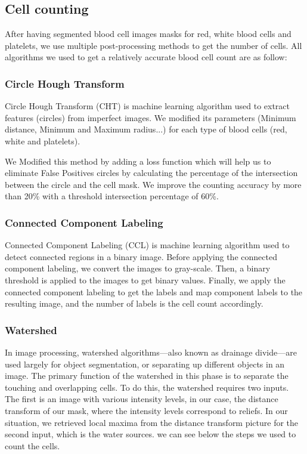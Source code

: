 \documentclass[conference]{IEEEtran}
\begin{document}
\subsection{Cell counting}
After having segmented blood cell images masks for red, white blood cells and platelets, we use multiple post-processing methods to get the number of cells. All  algorithms we used to get a relatively accurate blood cell
count are as follow:
\subsubsection{Circle Hough Transform}
\hspace{\parindent}
Circle Hough Transform (CHT) is machine learning algorithm used to extract features (circles) from imperfect images.
We modified its parameters (Minimum distance, Minimum and Maximum radius...) for each type of blood cells (red, white and platelets).

We Modified this method by adding a loss function which will help us to eliminate False Positives circles by calculating the percentage of the intersection between the circle and the cell mask. We improve the counting accuracy by more than 20\% with a threshold intersection percentage of 60\%.

\subsubsection{Connected Component Labeling}
\hspace{\parindent}
Connected Component Labeling (CCL) is machine learning algorithm used to detect connected regions in a binary image.
Before applying the connected component labeling, we convert the images to gray-scale. Then, a binary threshold is applied to the images to get binary values.
Finally, we apply the connected component labeling to get the labels and map component labels to the resulting image, and the number of labels is the cell count accordingly.


\subsubsection{Watershed}
\hspace{\parindent}
In image processing, watershed algorithms—also known as drainage divide—are used largely for object segmentation, or separating up different objects in an image. The primary function of the watershed in this phase is to separate the touching and overlapping cells. To do this, the watershed requires two inputs. The first is an image with various intensity levels, in our case, the distance transform of our mask, where the intensity levels correspond to reliefs. In our situation, we retrieved local maxima from the distance transform picture for the second input, which is the water sources. we can see below the steps we used to count the cells.
\end{document}
